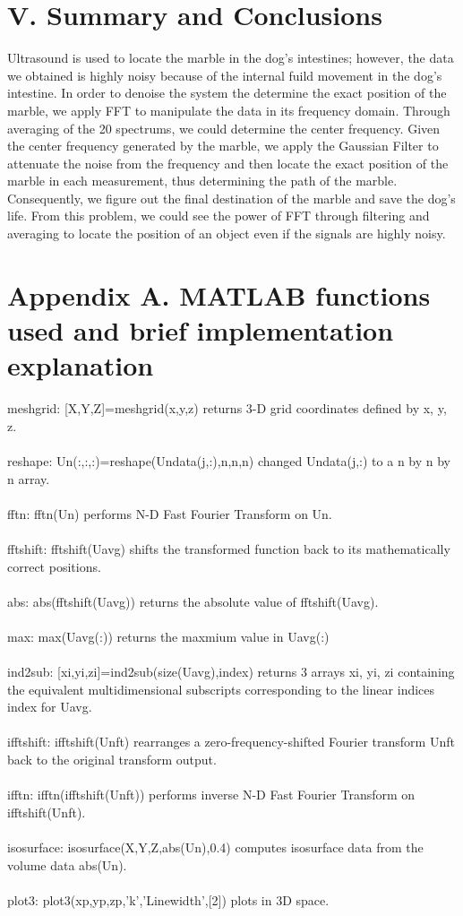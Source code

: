 \documentclass[12pt,letterpaper]{article}
\begin{document}
\section*{V. Summary and Conclusions}
Ultrasound is used to locate the marble in the dog's intestines; however, the data we obtained is highly noisy because of the internal fuild movement in the dog's intestine. In order to denoise the system the determine the exact position of the marble, we apply FFT to manipulate the data in its frequency domain. Through averaging of the 20 spectrums, we could determine the center frequency. Given the center frequency generated by the marble, we apply the Gaussian Filter to attenuate the noise from the frequency and then locate the exact position of the marble in each measurement, thus determining the path of the marble. Consequently, we figure out the final destination of the marble and save the dog's life. From this problem, we could see the power of FFT through filtering and averaging to locate the position of an object even if the signals are highly noisy.
\newpage 
\section*{Appendix A. MATLAB functions used and brief implementation explanation}
meshgrid: [X,Y,Z]=meshgrid(x,y,z) returns 3-D grid coordinates defined by x, y, z. 
\\
\\reshape: Un(:,:,:)=reshape(Undata(j,:),n,n,n) changed Undata(j,:) to a n by n by n array.
\\
\\fftn: fftn(Un) performs N-D Fast Fourier Transform on Un.
\\
\\fftshift: fftshift(Uavg) shifts the transformed function back to its mathematically correct
positions.
\\
\\abs:  abs(fftshift(Uavg)) returns the absolute value of fftshift(Uavg). 
\\
\\max: max(Uavg(:)) returns the maxmium value in Uavg(:)
\\
\\ind2sub: [xi,yi,zi]=ind2sub(size(Uavg),index) returns 3 arrays xi, yi, zi containing the equivalent multidimensional subscripts corresponding to the linear indices index for Uavg. 
\\
\\ifftshift: ifftshift(Unft) rearranges a zero-frequency-shifted Fourier transform Unft back to the original transform output.
\\
\\ifftn: ifftn(ifftshift(Unft)) performs inverse N-D Fast Fourier Transform on ifftshift(Unft).
\\
\\isosurface: isosurface(X,Y,Z,abs(Un),0.4) computes isosurface data from the volume data abs(Un). 
\\
\\plot3: plot3(xp,yp,zp,'k','Linewidth',[2]) plots in 3D space. 
\newpage
\end{document}
